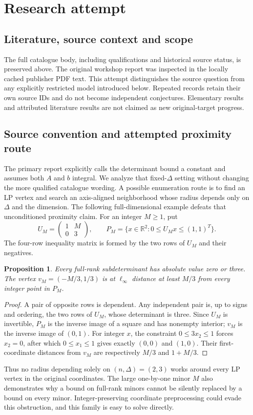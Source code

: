 \documentclass[11pt]{article}
\newtheorem{proposition}{Proposition}
\begin{document}
\section{Research attempt}
\subsection{Literature, source context and scope}
The full catalogue body, including qualifications and historical source status, is preserved above. The original workshop report was inspected in the locally cached publisher PDF text. This attempt distinguishes the source question from any explicitly restricted model introduced below. Repeated records retain their own source IDs and do not become independent conjectures. Elementary results and attributed literature results are not claimed as new original-target progress.

\subsection{Source convention and attempted proximity route}
The primary report explicitly calls the determinant bound a constant and assumes both $A$ and $b$ integral. We analyze that fixed-$\Delta$ setting without changing the more qualified catalogue wording. A possible enumeration route is to find an LP vertex and search an axis-aligned neighborhood whose radius depends only on $\Delta$ and the dimension. The following full-dimensional example defeats that unconditioned proximity claim.
For an integer $M\ge1$, put
\[
 U_M=\begin{pmatrix}1&M\\0&3\end{pmatrix},\qquad
 P_M=\{x\in\mathbb R^2:0\le U_Mx\le(1,1)^T\}.
\]
The four-row inequality matrix is formed by the two rows of $U_M$ and their negatives.
\begin{proposition}
Every full-rank subdeterminant has absolute value zero or three. The vertex $v_M=(-M/3,1/3)$ is at $\ell_\infty$ distance at least $M/3$ from every integer point in $P_M$.
\end{proposition}
\begin{proof}
A pair of opposite rows is dependent. Any independent pair is, up to signs and ordering, the two rows of $U_M$, whose determinant is three. Since $U_M$ is invertible, $P_M$ is the inverse image of a square and has nonempty interior; $v_M$ is the inverse image of $(0,1)$. For integer $x$, the constraint $0\le3x_2\le1$ forces $x_2=0$, after which $0\le x_1\le1$ gives exactly $(0,0)$ and $(1,0)$. Their first-coordinate distances from $v_M$ are respectively $M/3$ and $1+M/3$.
\end{proof}
Thus no radius depending solely on $(n,\Delta)=(2,3)$ works around every LP vertex in the original coordinates. The large one-by-one minor $M$ also demonstrates why a bound on full-rank minors cannot be silently replaced by a bound on every minor. Integer-preserving coordinate preprocessing could evade this obstruction, and this family is easy to solve directly.
\end{document}
